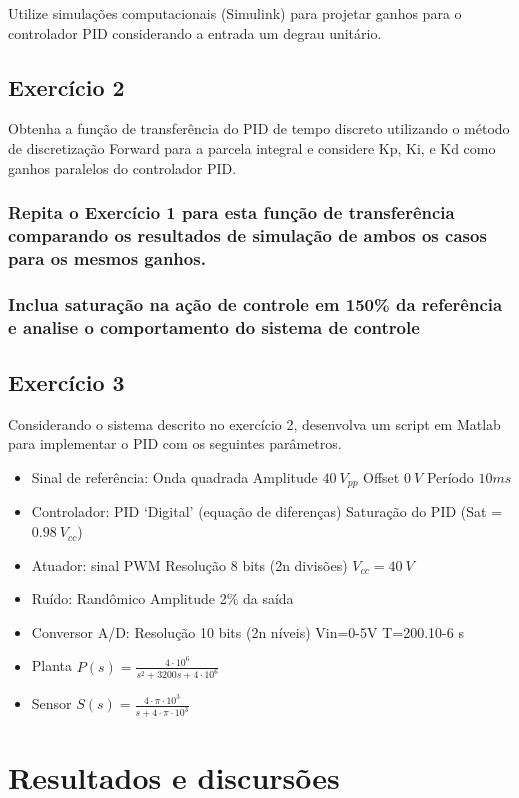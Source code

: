 Utilize simulações computacionais (Simulink\textregistered) para projetar ganhos para o controlador PID considerando a entrada um degrau unitário.

\subsection{Exercício 2}

Obtenha a função de transferência do PID de tempo discreto utilizando o método de discretização Forward para a parcela integral e considere Kp, Ki, e Kd como ganhos paralelos do controlador PID.

\subsubsection{Repita o Exercício 1 para esta função de transferência comparando os resultados de simulação de ambos os casos para os mesmos ganhos.}

\subsubsection{Inclua saturação na ação de controle em 150\% da referência e analise o comportamento do sistema de controle}

\subsection{Exercício 3}
Considerando o sistema descrito no exercício 2, desenvolva um script em Matlab para implementar o PID com os seguintes parâmetros.

\begin{itemize}
	\item Sinal de referência:
	Onda quadrada
	Amplitude $40~V_{pp}$
	Offset $0~V$
	Período $10ms$
	\item Controlador:
	PID ‘Digital’ (equação de diferenças)
	Saturação do PID (Sat = $0.98~V_{cc}$)
	\item Atuador: sinal PWM
	Resolução 8 bits (2n divisões)
	$V_{cc}=40~V$
	\item Ruído:
	Randômico
	Amplitude 2\% da saída
	\item Conversor A/D:
	Resolução 10 bits (2n níveis)
	Vin=0-5V
	T=200.10-6 s
	\item Planta
	$P(s)=\frac{4 \cdot 10^{6}}{s^{2}+3200s+4 \cdot 10^{6}}$
	\item Sensor
	$S(s)=\frac{4 \cdot \pi \cdot 10^{3}}{s + 4 \cdot \pi \cdot 10^{3}}$
\end{itemize}


\section{Resultados e discursões}